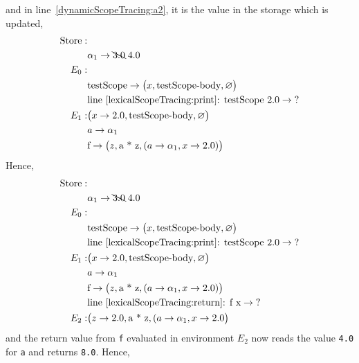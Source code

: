 \documentclass[fsharpnotes.tex]{subfiles}
\begin{document}
and in line~\ref{dynamicScopeTracing:a2}, it is the value in the storage which is updated,
\begin{align*}
  \text{Store}: &\\
  & \alpha_1 \rightarrow \bcancel{3.0}\; 4.0\\
  E_0:&\\
      &\text{testScope} \rightarrow \big(x, \text{testScope-body}, \varnothing\big)\\
      & \text{line~\ref{lexicalScopeTracing:print}: testScope 2.0} \rightarrow \text{?}\\
  E_1: & \big(x\rightarrow 2.0, \text{testScope-body}, \varnothing\big)\\
      & a \rightarrow \alpha_1\\
      & \text{f} \rightarrow \big(z, \text{a * z}, (a \rightarrow \alpha_1, x\rightarrow 2.0)\big)\\
\end{align*}
Hence,
\begin{align*}
  \text{Store}: &\\
  & \alpha_1 \rightarrow \bcancel{3.0}\; 4.0\\
  E_0:&\\
      &\text{testScope} \rightarrow \big(x, \text{testScope-body}, \varnothing\big)\\
      & \text{line~\ref{lexicalScopeTracing:print}: testScope 2.0} \rightarrow \text{?}\\
  E_1: & \big(x\rightarrow 2.0, \text{testScope-body}, \varnothing\big)\\
      & a \rightarrow \alpha_1\\
      & \text{f} \rightarrow \big(z, \text{a * z}, (a \rightarrow \alpha_1, x\rightarrow 2.0)\big)\\
      & \text{line~\ref{lexicalScopeTracing:return}: f x} \rightarrow \text{?}\\
  E_2: & \big(z \rightarrow 2.0, \text{a * z}, (a \rightarrow \alpha_1, x\rightarrow 2.0\big)\\
\end{align*}
and the return value from \lstinline!f! evaluated in environment $E_2$ now reads the value \lstinline!4.0! for \lstinline!a! and returns \lstinline!8.0!. Hence,
\end{document}
